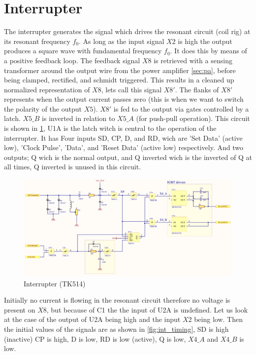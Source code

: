 \newpage
\section{Interrupter}
\label{sec:interrupter}

The interrupter generates the signal which drives the resonant circuit (coil rig) at its resonant frequency $f_0$. As long as the input signal $X2$ is high the output produces a square wave with fundamental frequency $f_0$. It does this by means of a positive feedback loop. The feedback signal $X8$ is retrieved with a sensing transformer around the output wire from the power amplifier \cref{sec:pa}, before being clamped, rectified, and schmidt triggered. This results in a cleaned up normalized representation of $X8$, lets call this signal $X8'$. The flanks of $X8'$ represents when the output current passes zero (this is when we want to switch the polarity of the output $X5$). $X8'$ is fed to the output via gates controlled by a latch. $X5\_B$ is inverted in relation to $X5\_A$ (for push-pull operation). This circuit is shown in \cref{fig:interrupter}, U1A is the latch witch is central to the operation of the interrupter. It has Four inputs SD, CP, D, and RD, wich are 'Set Data' (active low), 'Clock Pulse', 'Data', and 'Reset Data' (active low) respectively. And two outputs; Q wich is the normal output, and Q inverted wich is the inverted of Q at all times, Q inverted is unused in this circuit.

\begin{figure}[H]
    \centering
    \includegraphics[width=0.9\textheight,angle=-90]{Skjema/TK514_Interrupter.pdf}
    \caption{Interrupter (TK514)}
    \label{fig:interrupter}
\end{figure}

\newpage

Initially no current is flowing in the resonant circuit therefore no voltage is present on $X8$, but because of C1 the the input of U2A is undefined. Let us look at the case of the output of U2A being high and the input $X2$ being low. Then the initial values of the signals are as shown in \cref{fig:int_timing}, SD is high (inactive) CP is high, D is low, RD is low (active), Q is low, $X4\_A$ and $X4\_B$ is low.

